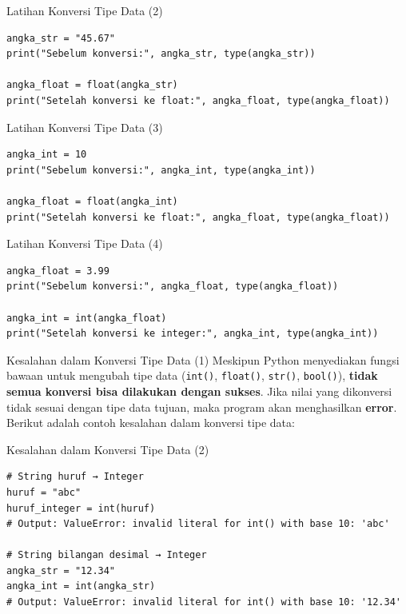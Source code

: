 \documentclass[aspectratio=169, table]{beamer}
\begin{document}
\begin{frame}[fragile]{Latihan Konversi Tipe Data (2)}
\begin{lstlisting}[style=PythonStyle, caption={Kode Python: string_to_float.py}]
angka_str = "45.67"
print("Sebelum konversi:", angka_str, type(angka_str))

angka_float = float(angka_str)
print("Setelah konversi ke float:", angka_float, type(angka_float))
\end{lstlisting}
\end{frame}

\begin{frame}[fragile]{Latihan Konversi Tipe Data (3)}
\begin{lstlisting}[style=PythonStyle, caption={Kode Python: int_to_float.py}]
angka_int = 10
print("Sebelum konversi:", angka_int, type(angka_int))

angka_float = float(angka_int)
print("Setelah konversi ke float:", angka_float, type(angka_float))
\end{lstlisting}
\end{frame}

\begin{frame}[fragile]{Latihan Konversi Tipe Data (4)}
\begin{lstlisting}[style=PythonStyle, caption={Kode Python: float_to_int.py}]
angka_float = 3.99
print("Sebelum konversi:", angka_float, type(angka_float))

angka_int = int(angka_float)
print("Setelah konversi ke integer:", angka_int, type(angka_int))
\end{lstlisting}
\end{frame}

\begin{frame}[fragile]{Kesalahan dalam Konversi Tipe Data (1)}
Meskipun Python menyediakan fungsi bawaan untuk mengubah tipe data (\texttt{int()}, \texttt{float()}, \texttt{str()}, \texttt{bool()}), \textbf{tidak semua konversi bisa dilakukan dengan sukses}. Jika nilai yang dikonversi tidak sesuai dengan tipe data tujuan, maka program akan menghasilkan \textbf{error}. Berikut adalah contoh kesalahan dalam konversi tipe data:
\end{frame}

\begin{frame}[fragile]{Kesalahan dalam Konversi Tipe Data (2)}
\begin{lstlisting}[style=PythonStyle]
# String huruf → Integer
huruf = "abc"
huruf_integer = int(huruf)  
# Output: ValueError: invalid literal for int() with base 10: 'abc'

# String bilangan desimal → Integer
angka_str = "12.34"
angka_int = int(angka_str)  
# Output: ValueError: invalid literal for int() with base 10: '12.34'
\end{lstlisting}
\end{frame}
\end{document}
